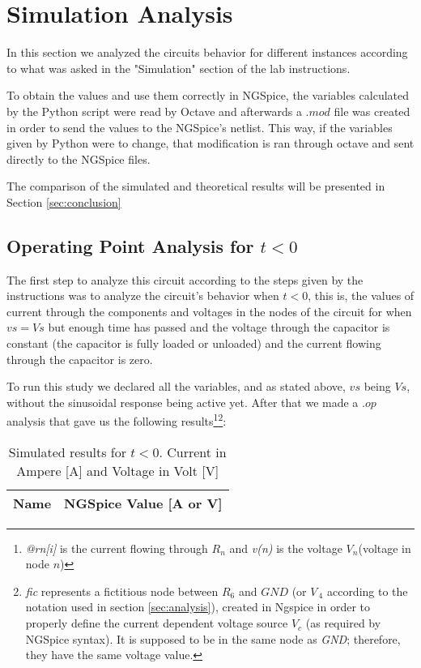 \section{Simulation Analysis}
\label{sec:simulation}
In this section we analyzed the circuits behavior for different instances according to what was asked in the "Simulation" section of the lab instructions.\par
To obtain the values and use them correctly in NGSpice, the variables calculated by the Python script were read by Octave and afterwards a $.mod$ file was created in order to send the values to the NGSpice's netlist. This way, if the variables given by Python were to change, that modification is ran through octave and sent directly to the NGSpice files.\par 
The comparison of the simulated and theoretical results will be presented in Section \ref{sec:conclusion}\par


\subsection{Operating Point Analysis for \textbf{$t<0$}}
\label{sec:sim1}
The first step to analyze this circuit according to the steps given by the instructions was to analyze the circuit's behavior when $t<0$, this is, the values of current through the components and voltages in the nodes of the circuit for when $vs=Vs$ but enough time has passed and the voltage through the capacitor is constant (the capacitor is fully loaded or unloaded) and the current flowing through the capacitor is zero. \par 
To run this study we declared all the variables, and as stated above, $vs$ being $Vs$, without the sinusoidal response being active yet. After that we made a $.op$ analysis that gave us the following results\footnote[1]{\textit{@rn[i]} is the current flowing through $R_n$ and \textit{v(n)} is the voltage $V_n$(voltage in node $n$)}\footnote[2]{\textit{fic} represents a fictitious node between $R_6$ and $GND$ (or $V_{~4}$ according to the notation used in section \ref{sec:analysis}), created in Ngspice in order to properly define the current dependent voltage source $V_c$ (as required by NGSpice syntax). It is supposed to be in the same node as \textit{GND}; therefore, they have the same voltage value.}:

\FloatBarrier
\begin{table}[h]
	\centering
	\begin{tabular}{|l|r|}
		\hline    
		{\bf Name} & {\bf NGSpice Value [A or V]} \\ \hline
		
			
	\end{tabular}
	\caption{Simulated results for $t<0$. Current in Ampere [A] and Voltage in Volt [V]}
    \label{tab:ngspice1}
\end{table}
\FloatBarrier

